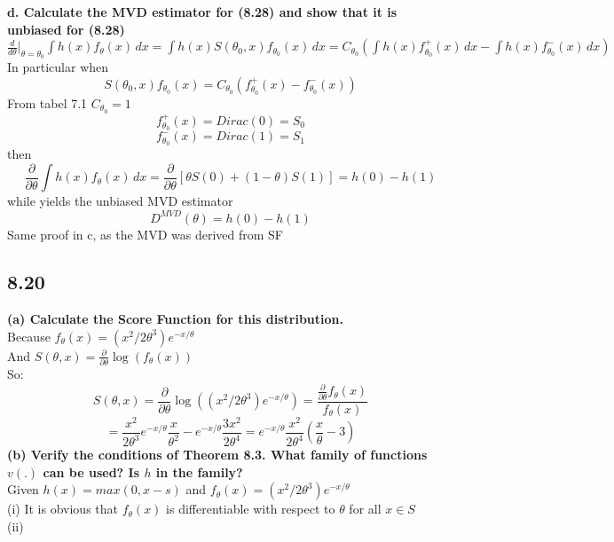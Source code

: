 \documentclass{article}
\begin{document}
\textbf{d. Calculate the MVD estimator for (8.28) and show that it is unbiased for (8.28)} \\
$ \frac{d}{d\theta}|_{\theta=\theta_0}{\textstyle \int h(x)f_\theta(x)\,dx} = {\textstyle \int h(x)S(\theta_0,x)f_{\theta_0}(x)\,dx}=C_{\theta_0}({\textstyle \int h(x)f_{\theta_0}^+(x)\,dx}-{\textstyle \int h(x)f_{\theta_0}^-(x)\,dx}) $  \\
In particular when $$ S(\theta_0,x)f_{\theta_0}(x)=C_{\theta_0}(f_{\theta_0}^+(x)-f_{\theta_0}^-(x)) $$
From tabel 7.1 $C_{\theta_0} = 1$  \\
$$ f_{\theta_0}^+(x) = Dirac(0) = S_0 $$
$$ f_{\theta_0}^-(x) = Dirac(1) = S_1 $$
then $$ \frac{\partial}{\partial\theta}{\textstyle \int h(x)f_\theta(x)\,dx} = \frac{\partial}{\partial\theta}[\theta S(0)+(1-\theta)S(1)] = h(0)-h(1)  $$
while yields the unbiased MVD estimator $$ D^{MVD}(\theta) = h(0)-h(1) $$
Same proof in c, as the MVD was derived from SF

\subsection{8.20}

\textbf{(a) Calculate the Score Function for this distribution.} \\
Because $f_\theta(x)=(x^2/2\theta^3)e^{-x/\theta}$  \\
And $S(\theta, x)=\frac{\partial}{\partial \theta}\log(f_\theta(x))$ \\
So: $$ S(\theta, x) = \frac{\partial}{\partial \theta}\log((x^2/2\theta^3)e^{-x/\theta}) = \frac{\frac{\partial}{\partial \theta}f_\theta(x)}{f_\theta(x)} $$
$$ = \frac{x^2}{2\theta^3} e^{-x/\theta}\frac{x}{\theta^2}-e^{-x/\theta}\frac{3x^2}{2\theta^4} = e^{-x/\theta}\frac{x^2}{2\theta^4}(\frac{x}{\theta}-3) $$
\textbf{(b) Verify the conditions of Theorem 8.3. What family of functions $v(.)$ can be used? Is $h$ in the family?} \\
Given $h(x) = max(0, x-s)$ and $f_\theta(x)=(x^2/2\theta^3)e^{-x/\theta}$ \\
(i) It is obvious that $f_\theta(x)$ is differentiable with respect to $\theta$ for all $x\in S$  \\
(ii) 
\end{document}
